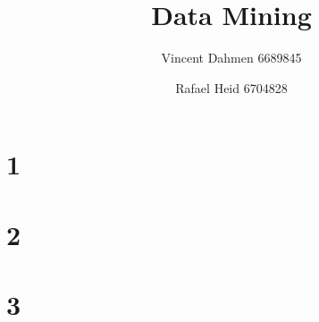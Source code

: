 \documentclass[12pt,a4paper]{article}
\title{Data Mining}
\author{Vincent Dahmen 6689845 \and Rafael Heid 6704828}
\begin{document}
\maketitle{}


\section*{1}
%
\section*{2}

\section*{3}

\end{document}
